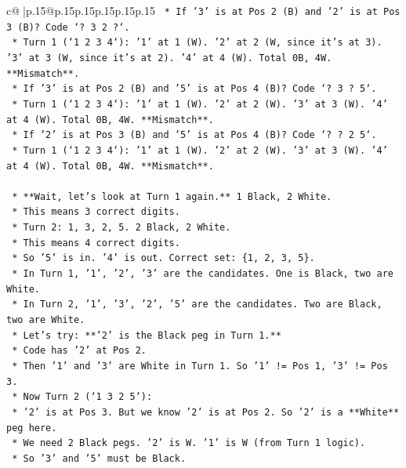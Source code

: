 \documentclass{article}
\begin{document}
{\begin{supertabular}{c@{$\;$}|p{.15\linewidth}@{}p{.15\linewidth}p{.15\linewidth}p{.15\linewidth}p{.15\linewidth}p{.15\linewidth}}
{{{\texttt{        *   If '3' is at Pos 2 (B) and '2' is at Pos 3 (B)? Code `? 3 2 ?`.} \\
\texttt{            *   Turn 1 (`1 2 3 4`): '1' at 1 (W). '2' at 2 (W, since it's at 3). '3' at 3 (W, since it's at 2). '4' at 4 (W). Total 0B, 4W. **Mismatch**.} \\
\texttt{        *   If '3' is at Pos 2 (B) and '5' is at Pos 4 (B)? Code `? 3 ? 5`.} \\
\texttt{            *   Turn 1 (`1 2 3 4`): '1' at 1 (W). '2' at 2 (W). '3' at 3 (W). '4' at 4 (W). Total 0B, 4W. **Mismatch**.} \\
\texttt{        *   If '2' is at Pos 3 (B) and '5' is at Pos 4 (B)? Code `? ? 2 5`.} \\
\texttt{            *   Turn 1 (`1 2 3 4`): '1' at 1 (W). '2' at 2 (W). '3' at 3 (W). '4' at 4 (W). Total 0B, 4W. **Mismatch**.} \\
\\ 
\texttt{    *   **Wait, let's look at Turn 1 again.** 1 Black, 2 White.} \\
\texttt{        *   This means 3 correct digits.} \\
\texttt{        *   Turn 2: 1, 3, 2, 5. 2 Black, 2 White.} \\
\texttt{        *   This means 4 correct digits.} \\
\texttt{        *   So '5' is in. '4' is out. Correct set: \{1, 2, 3, 5\}.} \\
\texttt{        *   In Turn 1, '1', '2', '3' are the candidates. One is Black, two are White.} \\
\texttt{        *   In Turn 2, '1', '3', '2', '5' are the candidates. Two are Black, two are White.} \\
\texttt{        *   Let's try: **'2' is the Black peg in Turn 1.**} \\
\texttt{            *   Code has '2' at Pos 2.} \\
\texttt{            *   Then '1' and '3' are White in Turn 1. So '1' != Pos 1, '3' != Pos 3.} \\
\texttt{            *   Now Turn 2 (`1 3 2 5`):} \\
\texttt{                *   '2' is at Pos 3. But we know '2' is at Pos 2. So '2' is a **White** peg here.} \\
\texttt{                *   We need 2 Black pegs. '2' is W. '1' is W (from Turn 1 logic).} \\
\texttt{                *   So '3' and '5' must be Black.} \\
}}}
\end{supertabular}}
\end{document}
